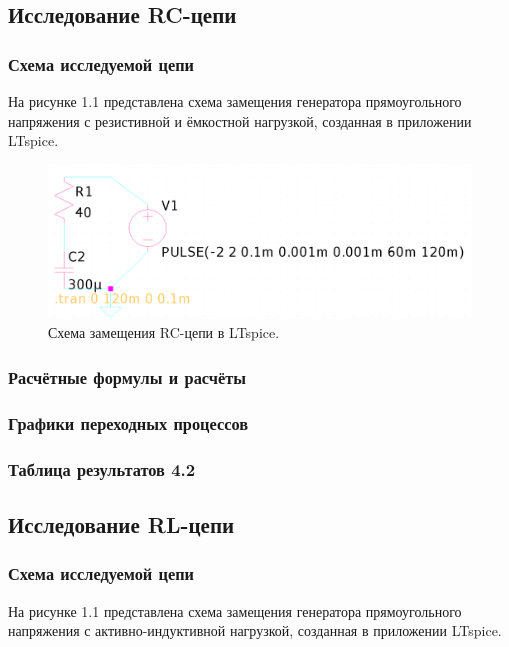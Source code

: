 \subsection{Исследование RC-цепи}

\subsubsection{Схема исследуемой цепи}
На рисунке 1.1 представлена схема замещения генератора прямоугольного напряжения с резистивной и ёмкостной нагрузкой, созданная в приложении LTspice.

\begin{figure}[H]
	\centering
	\includegraphics[width=1\textwidth]{./data/rc-schema.png}
	\caption{Схема замещения RC-цепи в LTspice.}
\end{figure}

\subsubsection{Расчётные формулы и расчёты}


\subsubsection{Графики переходных процессов}


\subsubsection{Таблица результатов 4.2}





\subsection{Исследование RL-цепи}

\subsubsection{Схема исследуемой цепи}
На рисунке 1.1 представлена схема замещения генератора прямоугольного напряжения с активно-индуктивной нагрузкой, созданная в приложении LTspice.

